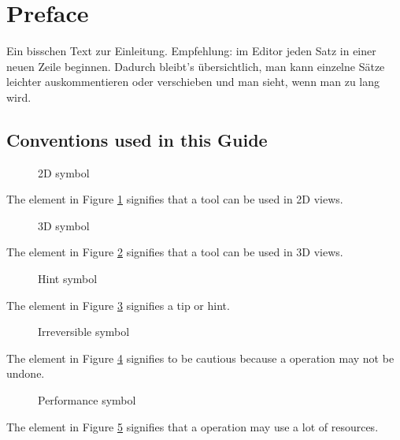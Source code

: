 \section{Preface}
Ein bisschen Text zur Einleitung.
Empfehlung: im Editor jeden Satz in einer neuen Zeile beginnen.
Dadurch bleibt's übersichtlich, man kann einzelne Sätze leichter auskommentieren oder verschieben und man sieht, wenn man zu lang wird.

\subsection{Conventions used in this Guide}
\begin{figure}[h!] %
	\centering
	
	\caption{2D symbol}
	\label{fig:2d_icon}
\end{figure}
The element in Figure \ref{fig:2d_icon} signifies that a tool can be used in 2D views.\newline

\begin{figure}[h!] %
	\centering
	
	\caption{3D symbol}
	\label{fig:3d_icon}
\end{figure}
The element in Figure \ref{fig:3d_icon} signifies that a tool can be used in 3D views.\newline

\begin{figure}[h!] %
	\centering
	
	\caption{Hint symbol}
	\label{fig:hint_icon}
\end{figure}
The element in Figure \ref{fig:hint_icon} signifies a tip or hint.\newline

\begin{figure}[h!] %
	\centering
	
	\caption{Irreversible symbol}
	\label{fig:noundo_icon}
\end{figure}
The element in Figure \ref{fig:noundo_icon} signifies to be cautious because a operation may not be undone.\pagebreak

\begin{figure}[h!] %
	\centering
	
	\caption{Performance symbol}
	\label{fig:performance_icon}
\end{figure}
The element in Figure \ref{fig:performance_icon} signifies that a operation may use a lot of resources.\newline

